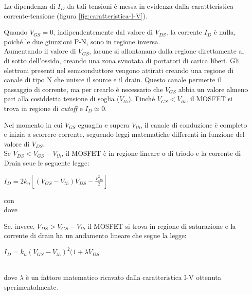 La dipendenza di $I_D$ da tali tensioni è messa in evidenza dalla carattteristica corrente-tensione (figura \ref{fig:caratteristica-I-V}).

Quando $V_{GS} = 0$, indipendentemente dal valore di $V_{DS}$, la corrente $I_D$ è nulla, poiché le due giunzioni P-N, sono in regione inversa. \\
Aumentando il valore di $V_{GS}$, lacune si allontanano dalla regione direttamente al di sotto dell'ossido, creando una
zona svuotata di portatori di carica liberi. Gli elettroni presenti nel semiconduttore
vengono attirati creando una regione di canale di tipo N che unisce il
source e il drain. Questo canale permette il passaggio di corrente, ma per crearlo è necessario che $V_{GS}$ abbia un valore almeno pari alla cosiddetta tensione di soglia ($V_{th}$). Finché $V_{GS} < V_{th}$, il MOSFET si trova in regione di \emph{cutoff} e $I_D \simeq 0$.

Nel momento in cui $V_{GS}$ eguaglia e supera $V_{th}$, il canale di conduzione è completo e inizia a scorrere corrente, seguendo leggi matematiche differenti in funzione del valore di $V_{DS}$.\\

Se $V_{DS} < V_{GS} -  V_{th}$, il MOSFET è in regione lineare o di triodo e la corrente di Drain seue le seguente legge:\\
\centerline{ $I_D = 2k_n\left[ \left(V_{GS}-V_{th}\right)V_{DS} - \frac{V_{DS}^2}{2}\right]$}
con \\
dove

Se, invece, $V_{DS} > V_{GS} -  V_{th}$ il MOSFET si trova in regione di saturazione e la corrente di drain ha un andamento lineare che segue la legge:\\
\centerline{ $I_D = k_n\left(V_{GS}-V_{th}\right)^2 (1+\lambda V_{DS}$}\\
dove $\lambda$ è un fattore matematico ricavato dalla caratteristica I-V ottenuta sperimentalmente.








